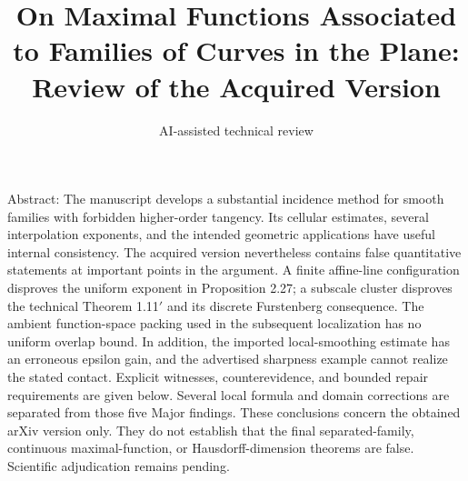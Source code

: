 \documentclass[10pt]{article}
\title{On Maximal Functions Associated to Families of Curves in the Plane:
Review of the Acquired Version}
\author{AI-assisted technical review}
\date{}
\begin{document}
\maketitle
Abstract: The manuscript develops a substantial incidence method for smooth families with forbidden higher-order tangency. Its cellular estimates, several interpolation exponents, and the intended geometric applications have useful internal consistency. The acquired version nevertheless contains false quantitative statements at important points in the argument. A finite affine-line configuration disproves the uniform exponent in Proposition 2.27; a subscale cluster disproves the technical Theorem 1.11\('\) and its discrete Furstenberg consequence. The ambient function-space packing used in the subsequent localization has no uniform overlap bound. In addition, the imported local-smoothing estimate has an erroneous epsilon gain, and the advertised sharpness example cannot realize the stated contact. Explicit witnesses, counterevidence, and bounded repair requirements are given below. Several local formula and domain corrections are separated from those five Major findings. These conclusions concern the obtained arXiv version only. They do not establish that the final separated-family, continuous maximal-function, or Hausdorff-dimension theorems are false. Scientific adjudication remains pending.\par
\end{document}
